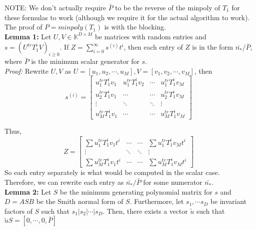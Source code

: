 \documentclass[12pt]{article}
\begin{document}
\noindent NOTE: We don't actually require $\bar{P}$ to be the reverse of the minpoly of $T_1$ for
these formulas to work (although we require it for the actual algorithm to work). The proof
of $P = minpoly(T_1)$ is with the blocking.\\

\noindent\textbf{Lemma 1:} Let $U,V \in \mathbb{K}^{D\times M}$
be matrices with random entries and $s = (U^{tr}T_1^iV)_{i \ge 0}$. If 
$Z = \sum_{i = 0}^{\infty} s^{(i)} t^i$, then each entry of $Z$ is
in the form $\bar{n_*}/\bar{P}$, where $\bar{P}$ is the minimum scalar generator for
$s$.\\

\noindent\textit{Proof:} Rewrite $U,V$ as 
$U = [u_1,u_2,\cdots,u_M], V= [v_1,v_2,\cdots,v_M]$, then 
$$s^{(i)} = 
\begin{bmatrix}
u_1^{tr}T_1^iv_1 & u_1^{tr}T_1^iv_2 & \cdots   & u_1^{tr}T_1^iv_M \\
u_2^{tr}T_1^iv_1 & \cdots           & \cdots   & u_2^{tr}T_1^iv_M \\
\vdots           & \ddots           & \ddots   & \vdots \\
u_M^{tr}T_1^iv_1 & \cdots           & \cdots   & u_M^{tr}T_1^iv_M
\end{bmatrix}$$

Thus, 	
$$ Z = 
\begin{bmatrix}
\sum u_1^{tr}T_1^iv_1 t^i & \cdots  & \cdots & \sum u_1^{tr}T_1^iv_M t^i \\
\vdots                    & \ddots  & \ddots & \vdots \\
\sum u_M^{tr}T_1^iv_1 t^i & \cdots  & \cdots & \sum u_M^{tr}T_1^iv_M  t^i
\end{bmatrix}$$
So each entry separately is what would be computed in the scalar case. Therefore,
we can rewrite each entry as $\bar{n_*}/\bar{P}$ for some numerator $\bar{n_*}$.\\

\noindent\textbf{Lemma 2:} Let $S$ be the minimum generating polynomial matrix for $s$
and $D = ASB$ be the Smith normal form of $S$. Furthermore, let $s_1, \cdots s_D$ be
invariant factors of $S$ such that $s_1 | s_2 | \cdots | s_D$. Then, there exists a vector $\tilde{u}$
such that $\tilde{u} S = [0, \cdots, 0, \bar{P}]$\\
\end{document}
